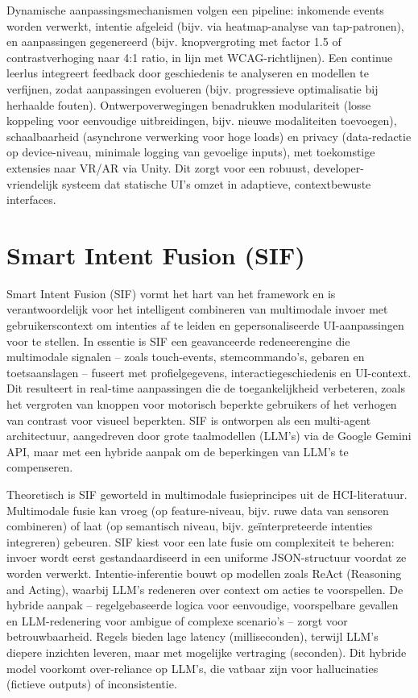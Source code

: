 \documentclass[openany]{book}
\begin{document}
Dynamische aanpassingsmechanismen volgen een pipeline: inkomende events worden verwerkt, intentie afgeleid (bijv. via heatmap-analyse van tap-patronen), en aanpassingen gegenereerd (bijv. knopvergroting met factor 1.5 of contrastverhoging naar 4:1 ratio, in lijn met WCAG-richtlijnen). Een continue leerlus integreert feedback door geschiedenis te analyseren en modellen te verfijnen, zodat aanpassingen evolueren (bijv. progressieve optimalisatie bij herhaalde fouten). Ontwerpoverwegingen benadrukken modulariteit (losse koppeling voor eenvoudige uitbreidingen, bijv. nieuwe modaliteiten toevoegen), schaalbaarheid (asynchrone verwerking voor hoge loads) en privacy (data-redactie op device-niveau, minimale logging van gevoelige inputs), met toekomstige extensies naar VR/AR via Unity. Dit zorgt voor een robuust, developer-vriendelijk systeem dat statische UI's omzet in adaptieve, contextbewuste interfaces.

\section*{Smart Intent Fusion (SIF)}
Smart Intent Fusion (SIF) vormt het hart van het framework en is verantwoordelijk voor het intelligent combineren van multimodale invoer met gebruikerscontext om intenties af te leiden en gepersonaliseerde UI-aanpassingen voor te stellen. In essentie is SIF een geavanceerde redeneerengine die multimodale signalen – zoals touch-events, stemcommando's, gebaren en toetsaanslagen – fuseert met profielgegevens, interactiegeschiedenis en UI-context. Dit resulteert in real-time aanpassingen die de toegankelijkheid verbeteren, zoals het vergroten van knoppen voor motorisch beperkte gebruikers of het verhogen van contrast voor visueel beperkten. SIF is ontworpen als een multi-agent architectuur, aangedreven door grote taalmodellen (LLM's) via de Google Gemini API, maar met een hybride aanpak om de beperkingen van LLM's te compenseren.

Theoretisch is SIF geworteld in multimodale fusieprincipes uit de HCI-literatuur. Multimodale fusie kan vroeg (op feature-niveau, bijv. ruwe data van sensoren combineren) of laat (op semantisch niveau, bijv. geïnterpreteerde intenties integreren) gebeuren. SIF kiest voor een late fusie om complexiteit te beheren: invoer wordt eerst gestandaardiseerd in een uniforme JSON-structuur voordat ze worden verwerkt. Intentie-inferentie bouwt op modellen zoals ReAct (Reasoning and Acting), waarbij LLM's redeneren over context om acties te voorspellen. De hybride aanpak – regelgebaseerde logica voor eenvoudige, voorspelbare gevallen en LLM-redenering voor ambigue of complexe scenario's – zorgt voor betrouwbaarheid. Regels bieden lage latency (milliseconden), terwijl LLM's diepere inzichten leveren, maar met mogelijke vertraging (seconden). Dit hybride model voorkomt over-reliance op LLM's, die vatbaar zijn voor hallucinaties (fictieve outputs) of inconsistentie.
\end{document}
